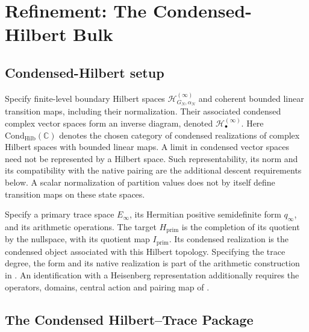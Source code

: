 \section{Refinement: The Condensed-Hilbert Bulk}
\label{v4-arith:w10-a:condensed-bulk}

\subsection{Condensed-Hilbert setup}
\label{v4-arith:w10-a:condensed-setup}

\begin{definition}
\label{v4-arith:w10-a:def:condensed-pro-system}
Specify finite-level boundary Hilbert spaces
$\mathcal H^{(\infty)}_{G_N,\alpha_N}$ and coherent bounded linear
transition maps, including their normalization.
Their associated condensed complex vector spaces form an inverse
diagram, denoted $\mathcal H^{(\infty)}_\bullet$.
Here $\mathrm{Cond}_{\mathrm{Hilb}}(\mathbb C)$ denotes the chosen
category of condensed realizations of complex Hilbert spaces with
bounded linear maps. A limit in condensed vector spaces need not be
represented by a Hilbert space. Such representability, its norm and
its compatibility with the native pairing are the additional descent
requirements below. A scalar normalization of partition values does
not by itself define transition maps on these state spaces.
\end{definition}

\begin{definition}
\label{v4-arith:w10-a:def:target-Hilbert}
Specify a primary trace space \(E_\infty\), its Hermitian positive
semidefinite form \(q_\infty\), and its arithmetic operations.
The target \(H_{\mathrm{prim}}\) is the completion of its quotient
by the nullspace, with its quotient map \(I_{\mathrm{prim}}\).
Its condensed realization is the condensed object associated with
this Hilbert topology. Specifying the trace degree, the form and
its native realization is part of the arithmetic construction in
.
An identification with a Heisenberg representation additionally
requires the operators, domains, central action and pairing map of
.
\end{definition}
\subsection{The Condensed Hilbert--Trace Package}
\label{v4-arith:w10-a:named-obstruction}

